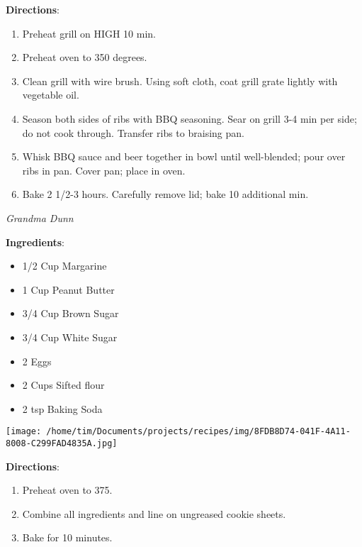 \documentclass[11pt, twoside, openany]{book}
\begin{document}
\textbf{Directions}:
\vspace{-3mm}\begin{enumerate}\setlength\itemsep{-1mm}
\item Preheat grill on HIGH 10 min.
\item Preheat oven to 350 degrees.
\item Clean grill with wire brush. Using soft cloth, coat grill grate lightly with vegetable oil. 
\item Season both sides of ribs with BBQ seasoning. Sear on grill 3-4 min per side; do not cook through. Transfer ribs to braising pan. 
\item Whisk BBQ sauce and beer together in bowl until well-blended; pour over ribs in pan. Cover pan; place in oven. 
\item Bake 2 1/2-3 hours. Carefully remove lid; bake 10 additional min.
\end{enumerate}
 \label{mom's-peanut-butter-cookies}\hfill\textit{Grandma Dunn}\\
\begin{minipage}[t]{0.8\linewidth}
\textbf{Ingredients}:\vspace{-3mm}
\begin{multicols}{2}
\begin{itemize}\setlength\itemsep{-1mm}
\item 1/2 Cup Margarine
\item 1 Cup Peanut Butter
\item 3/4 Cup Brown Sugar
\item 3/4 Cup White Sugar
\item 2 Eggs
\item 2 Cups Sifted flour
\item 2 tsp Baking Soda
\end{itemize}
\end{multicols}
\end{minipage}
\begin{minipage}[t]{0.2\linewidth}
\centering \strut\vspace*{-\baselineskip}\newline
\texttt{[image: /home/tim/Documents/projects/recipes/img/8FDB8D74-041F-4A11-8008-C299FAD4835A.jpg]}\\
\end{minipage}\vspace{3mm}
\textbf{Directions}:
\vspace{-3mm}\begin{enumerate}\setlength\itemsep{-1mm}
\item Preheat oven to 375.
\item Combine all ingredients and line on ungreased cookie sheets.
\item Bake for 10 minutes.
\end{enumerate}
\end{document}
